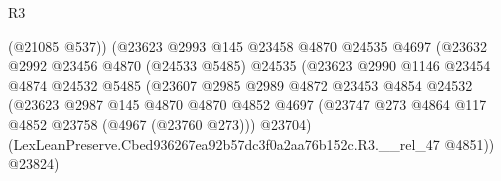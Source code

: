 \begin{lexlean}{R3}
\begin{coremodule}
                                            (@21085 @537))
                                          (@23623
                                            @2993
                                            @145
                                            @23458
                                            @4870
                                            @24535
                                            @4697
                                            (@23632
                                              @2992
                                              @23456
                                              @4870
                                              (@24533 @5485)
                                              @24535
                                              (@23623
                                                @2990
                                                @1146
                                                @23454
                                                @4874
                                                @24532
                                                @5485
                                                (@23607
                                                  @2985
                                                  @2989
                                                  @4872
                                                  @23453
                                                  @4854
                                                  @24532
                                                  (@23623
                                                    @2987
                                                    @145
                                                    @4870
                                                    @4870
                                                    @4852
                                                    @4697
                                                    (@23747
                                                      @273
                                                      @4864
                                                      @117
                                                      @4852
                                                      @23758
                                                      (@4967 (@23760 @273)))
                                                    @23704)
                                                  (LexLeanPreserve.Cbed936267ea92b57dc3f0a2aa76b152c.R3.__rel_47
                                                    @4851))
                                                @23824)

\end{coremodule}
\end{lexlean}
